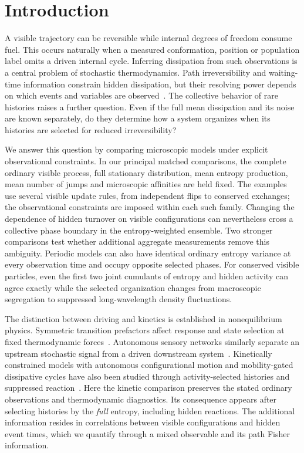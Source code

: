\documentclass[aps,pre,reprint,amsmath,amssymb,longbibliography,floatfix]{revtex4-2}
\begin{document}
\section{Introduction}
\label{sec:intro}
A visible trajectory can be reversible while internal degrees of freedom
consume fuel. This occurs naturally when a measured conformation, position
or population label omits a driven internal cycle. Inferring dissipation
from such observations is a central problem of stochastic thermodynamics.
Path irreversibility and waiting-time information constrain hidden
dissipation, but their resolving power depends on which events and
variables are observed~\cite{RoldanParrondo2012,SkinnerDunkel2021,DeguentherMeerSeifert2024}.
The collective behavior of rare histories raises a further question.
Even if the full mean dissipation and its noise are known separately,
do they determine how a system organizes when its histories are selected
for reduced irreversibility?

We answer this question by comparing microscopic models under explicit
observational constraints. In our principal matched comparisons, the complete ordinary visible process, full
stationary distribution, mean entropy production, mean number of jumps
and microscopic affinities are held fixed. The examples use several
visible update rules, from independent flips to conserved exchanges;
the observational constraints are imposed within each such family. Changing the dependence of
hidden turnover on visible configurations can nevertheless cross a
collective phase boundary in the entropy-weighted ensemble. Two stronger
comparisons test whether additional aggregate measurements remove this
ambiguity. Periodic models can also have identical ordinary entropy
variance at every observation time and occupy opposite selected phases.
For conserved visible particles, even the first two joint cumulants of
entropy and hidden activity can agree exactly while the selected
organization changes from macroscopic segregation to suppressed
long-wavelength density fluctuations.

The distinction between driving and kinetics is established in
nonequilibrium physics. Symmetric transition prefactors affect response
and state selection at fixed thermodynamic
forces~\cite{Maes2016Nondissipative}. Autonomous sensory networks similarly
separate an upstream stochastic signal from a driven downstream
system~\cite{BaratoHartichSeifert2013}. Kinetically constrained models with
autonomous configurational motion and mobility-gated dissipative cycles
have also been studied through activity-selected histories and suppressed
reaction~\cite{Kaneko2026KineticLocking}. Here the kinetic comparison
preserves the stated ordinary observations and thermodynamic diagnostics.
Its consequence appears after selecting histories by the \emph{full}
entropy, including hidden reactions. The additional information resides
in correlations between visible configurations and hidden event times,
which we quantify through a mixed observable and its path Fisher
information.
\end{document}
